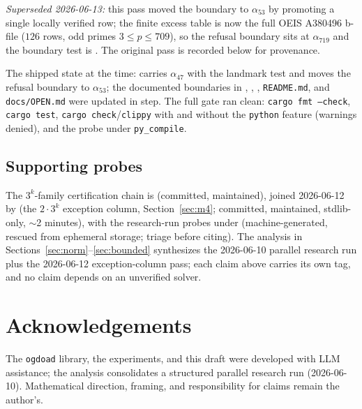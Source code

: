 \documentclass[11pt]{article}
\theoremstyle{plain}
\theoremstyle{definition}
\begin{document}
\emph{Superseded 2026-06-13:} this pass moved the boundary to
$\alpha_{53}$ by promoting a single locally verified row; the finite
excess table is now the full OEIS A380496 b-file ($126$ rows, odd primes
$3 \le p \le 709$), so the refusal boundary sits at $\alpha_{719}$ and the
boundary test is . The original
pass is recorded below for provenance.

The shipped state at the time:  carries
$\alpha_{47}$ with the landmark test
 and moves the refusal
boundary to $\alpha_{53}$; the documented boundaries in
, , ,
\texttt{README.md}, and \texttt{docs/OPEN.md} were updated in step. The full
gate ran clean: \texttt{cargo fmt --check}, \texttt{cargo test},
\texttt{cargo check}/\texttt{clippy} with and without the
\texttt{python} feature (warnings denied), and the probe under
\texttt{py\_compile}.

\subsection{Supporting probes}

The $3^k$-family certification chain is
 (committed, maintained),
joined 2026-06-12 by  (the
$2\cdot3^k$ exception column, Section~\ref{sec:m4}; committed,
maintained, stdlib-only, $\sim$2 minutes), with the research-run probes
under  (machine-generated, rescued from
ephemeral storage; triage before citing). The analysis in
Sections~\ref{sec:norm}--\ref{sec:bounded} synthesizes the 2026-06-10
parallel research run plus the 2026-06-12 exception-column pass; each
claim above carries its own tag, and no claim depends on an unverified
solver.

\section*{Acknowledgements}
The \texttt{ogdoad} library, the experiments, and this draft were
developed with LLM assistance; the analysis consolidates a structured
parallel research run (2026-06-10). Mathematical direction, framing, and
responsibility for claims remain the author's.
\end{document}
